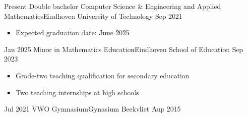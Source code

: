 %
%
%


\begin{educations}
    \education
        {Present}  {Double bachelor Computer Science \& Engineering and Applied Mathematics}{Eindhoven University of Technology}
        {Sep 2021} {
                    \begin{itemize}
                        \item Expected graduation date: June 2025
                    \end{itemize}
                   }
    \emptySeparator
    \education
        {Jan 2025} {Minor in Mathematics Education}{Eindhoven School of Education}
        {Sep 2023} {
                    \begin{itemize}
                        \item Grade-two teaching qualification for secondary education
                        \item Two teaching internships at high schools
                    \end{itemize}
                   }
    \emptySeparator
    \education
        {Jul 2021} {VWO Gymnasium}{Gynasium Beekvliet}
        {Aup 2015} {
                   }
\end{educations}

